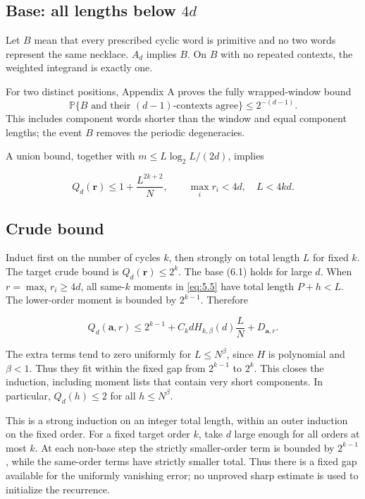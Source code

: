 \documentclass[11pt]{article}
\theoremstyle{remark}
\begin{document}
\subsection{\texorpdfstring{Base: all lengths below
\(4d\)}{Base: all lengths below 4d}}\label{base-all-lengths-below-4d}

Let \(B\) mean that every prescribed cyclic word is primitive and no two
words represent the same necklace. \(A_d\) implies \(B\). On \(B\) with
no repeated contexts, the weighted integrand is exactly one.

For two distinct positions, Appendix A proves the fully wrapped-window
bound \[
 \mathbb P\{B\text{ and their }(d-1)\text{-contexts agree}\}
 \le 2^{-(d-1)}.
\] This includes component words shorter than the window and equal
component lengths; the event \(B\) removes the periodic degeneracies.

A union bound, together with \(m\le L\log_2L/(2d)\), implies

\[
 Q_d(\mathbf r)\le1+\frac{L^{2k+2}}N,
 \qquad \max_i r_i<4d,\quad L<4kd.
 \tag{6.1}\label{eq:6.1}
\]

\subsection{Crude bound}\label{crude-bound}

Induct first on the number of cycles \(k\), then strongly on total
length \(L\) for fixed \(k\). The target crude bound is
\(Q_d(\mathbf r)\le 2^k\). The base (6.1) holds for large \(d\). When
\(r=\max_i r_i\ge4d\), all same-\(k\) moments in \eqref{eq:5.5} have total length
\(P+h<L\). The lower-order moment is bounded by \(2^{k-1}\). Therefore

\[
 Q_d(\mathbf a,r)\le2^{k-1}
 +C_k dH_{k,\beta}(d)\frac LN+D_{\mathbf a,r}.
\]

The extra terms tend to zero uniformly for \(L\le N^\beta\), since \(H\)
is polynomial and \(\beta<1\). Thus they fit within the fixed gap from
\(2^{k-1}\) to \(2^k\). This closes the induction, including moment
lists that contain very short components. In particular, \(Q_d(h)\le2\)
for all \(h\le N^\beta\).

This is a strong induction on an integer total length, within an outer
induction on the fixed order. For a fixed target order \(k\), take \(d\)
large enough for all orders at most \(k\). At each non-base step the
strictly smaller-order term is bounded by \(2^{k-1}\), while the
same-order terms have strictly smaller total. Thus there is a fixed gap
available for the uniformly vanishing error; no unproved sharp estimate
is used to initialize the recurrence.
\end{document}
